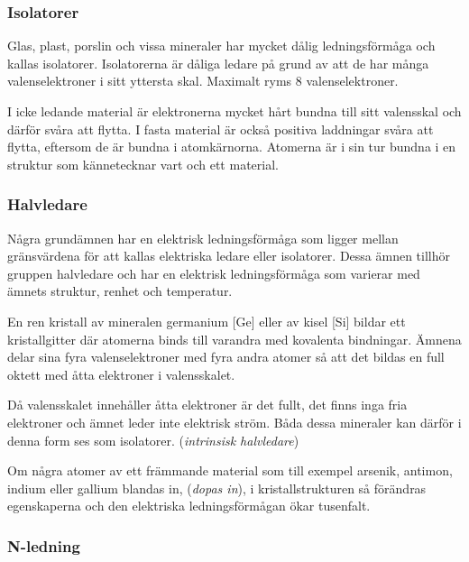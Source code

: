 \subsubsection{Isolatorer}

Glas, plast, porslin och vissa mineraler har mycket dålig ledningsförmåga och
kallas isolatorer.
Isolatorerna är dåliga ledare på grund av att de har många valenselektroner i
sitt yttersta skal.
Maximalt ryms 8 valenselektroner.

I icke ledande material är elektronerna mycket hårt bundna till sitt valensskal
och därför svåra att flytta.
I fasta material är också positiva laddningar svåra att flytta, eftersom de är
bundna i atomkärnorna.
Atomerna är i sin tur bundna i en struktur som kännetecknar vart och ett
material.

\subsubsection{Halvledare}

Några grundämnen har en elektrisk ledningsförmåga som ligger mellan gränsvärdena
för att kallas elektriska ledare eller isolatorer.
Dessa ämnen tillhör gruppen halvledare och har en elektrisk ledningsförmåga som
varierar med ämnets struktur, renhet och temperatur.

En ren kristall av mineralen germanium [Ge] eller av kisel [Si] bildar ett
kristallgitter där atomerna binds till varandra med kovalenta bindningar.
Ämnena delar sina fyra valenselektroner med fyra andra atomer så att det
bildas en full oktett med åtta elektroner i valensskalet.

Då valensskalet innehåller åtta elektroner är det fullt, det finns inga fria
elektroner och ämnet leder inte elektrisk ström.
Båda dessa mineraler kan därför i denna form ses som isolatorer.
(\emph{intrinsisk halvledare})

Om några atomer av ett främmande material som till exempel arsenik, antimon,
indium eller gallium blandas in, (\emph{dopas in}), i kristallstrukturen så
förändras egenskaperna och den elektriska ledningsförmågan ökar tusenfalt.

\subsubsection{N-ledning}


